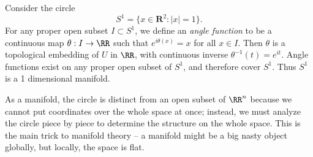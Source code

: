 \begin{example}
    Consider the circle
    \[ S^1 = \{ x \in \mathbf{R}^2 : |x| = 1 \}. \]
    For any proper open subset $I \subset S^1$, we define an \emph{angle function} to be a continuous map $\theta: I \to \RR$ such that $e^{i\theta(x)} = x$ for all $x \in I$. Then $\theta$ is a topological embedding of $U$ in $\RR$, with continuous inverse $\theta^{-1}(t) = e^{it}$. Angle functions exist on any proper open subset of $S^1$, and therefore cover $S^1$. Thus $S^1$ is a 1 dimensional manifold.
\end{example}



As a manifold, the circle is distinct from an open subset of $\RR^n$ because we cannot put coordinates over the whole space at once; instead, we must analyze the circle piece by piece to determine the structure on the whole space. This is the main trick to manifold theory -- a manifold might be a big nasty object globally, but locally, the space is flat.

